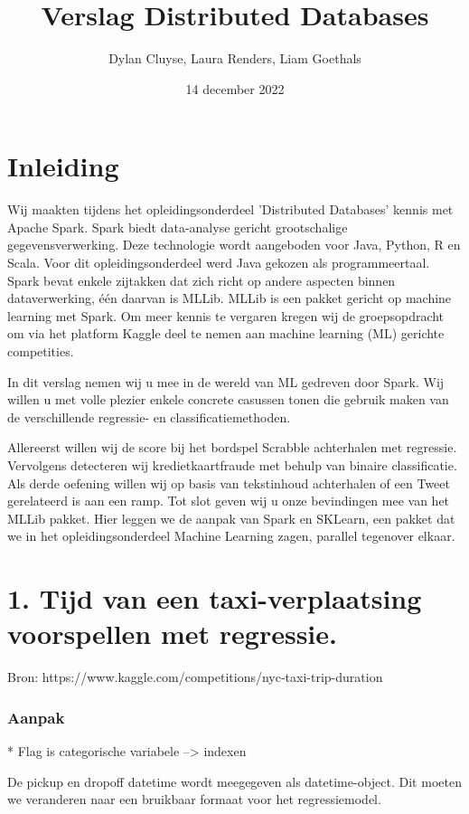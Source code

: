 \documentclass[a4paper,12pt,twoside]{report}
\title{
    Verslag Distributed Databases
    }
\author{Dylan {Cluyse}, Laura {Renders}, Liam {Goethals}}
\date{14 december 2022}
\begin{document}
\maketitle

\chapter*{Inleiding}

Wij maakten tijdens het opleidingsonderdeel 'Distributed Databases' kennis met Apache Spark. Spark biedt data-analyse gericht grootschalige gegevensverwerking. Deze technologie wordt aangeboden voor Java, Python, R en Scala. Voor dit opleidingsonderdeel werd Java gekozen als programmeertaal. Spark bevat enkele zijtakken dat zich richt op andere aspecten binnen dataverwerking, één daarvan is MLLib. MLLib is een pakket gericht op machine learning met Spark. Om meer kennis te vergaren kregen wij de groepsopdracht om via het platform Kaggle deel te nemen aan machine learning (ML) gerichte competities.

In dit verslag nemen wij u mee in de wereld van ML gedreven door Spark. Wij willen u met volle plezier enkele concrete casussen tonen die gebruik maken van de verschillende regressie- en classificatiemethoden.

Allereerst willen wij de score bij het bordspel Scrabble achterhalen met regressie. Vervolgens detecteren wij kredietkaartfraude met behulp van binaire classificatie. Als derde oefening willen wij op basis van tekstinhoud achterhalen of een Tweet gerelateerd is aan een ramp. Tot slot geven wij u onze bevindingen mee van het MLLib pakket. Hier leggen we de aanpak van Spark en SKLearn, een pakket dat we in het opleidingsonderdeel Machine Learning zagen, parallel tegenover elkaar.

\chapter*{1. Tijd van een taxi-verplaatsing voorspellen met regressie.}

Bron: https://www.kaggle.com/competitions/nyc-taxi-trip-duration

\subsection*{Aanpak}

* Flag is categorische variabele --> indexen

De pickup en dropoff datetime wordt meegegeven als datetime-object. Dit moeten we veranderen naar een bruikbaar formaat voor het regressiemodel.
\end{document}
